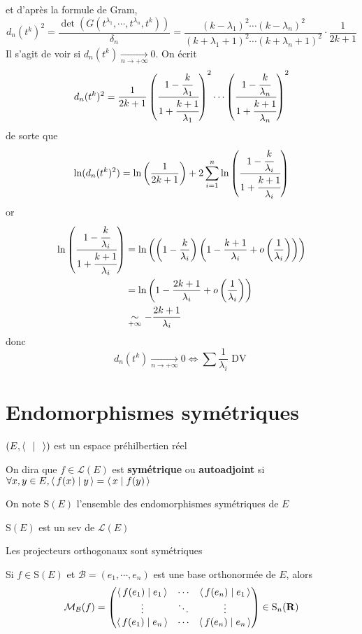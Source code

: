 et d'après la formule de Gram, \[
    d_n(t^k)^2 = \frac{\det(G(t^{\lambda_1}, \cdots , t^{\lambda_n}, t^k))}{\delta_n}= \frac{(k-\lambda_1)^2\cdots (k-\lambda_n)^2 }{(k+\lambda_1+1)^2 \cdots (k+\lambda_n+1)^2 } \cdot \frac{1}{2k+1}
\] 
Il s'agit de voir si $d_n(t^k) \xrightarrow[n\to+\infty]{}0$. On écrit \[
    d_n(t^k)^2 =\frac{1}{2k+1} \left( \cfrac{1-\cfrac k{\lambda_1}}{1+\cfrac{k+1}{\lambda_1}} \right) ^2  \cdots 
    \left( \cfrac{1-\cfrac k{\lambda_n}}{1+\cfrac{k+1}{\lambda_n}} \right) ^2
\] 
de sorte que \[
    \ln(d_n(t^k)^2 )= \ln\left( \frac{1}{2k+1} \right) + 2 \sum_{i=1}^{n} \ln\left( \cfrac{1-\cfrac k{\lambda_i}}{1+\cfrac{k+1}{\lambda_i}} \right) 
\] 
or \begin{align*}
    \ln\left( \cfrac{1-\cfrac k{\lambda_i}}{1+\cfrac{k+1}{\lambda_i}} \right) &= \ln \left( \left( 1-\frac{k}{\lambda_i} \right)  \left( 1-\frac{k+1}{\lambda_i}+o\left( \frac{1}{\lambda_i} \right)  \right) \right) \\ &=\ln\left( 1-\frac{2k+1}{\lambda_i}+o\left( \frac{1}{\lambda_i} \right)  \right) \\&\underset{+\infty}\sim -\frac{2k+1}{\lambda_i}
\end{align*}
donc \[
    d_n(t^k) \xrightarrow[n\to+\infty]{}0 \iff  \sum \frac{1}{\lambda_i}\text{ DV }
\] 

\section{Endomorphismes symétriques}

\begin{defprop}
    \Hyp $(E, \scalar{\;}{\;} )$ est un espace préhilbertien réel
    \begin{concenum}
    \item On dira que $f \in  \mathcal  L(E)$ est \textbf{symétrique} ou \textbf{autoadjoint} si $\forall  x, y \in  E, \scalar{f(x)}{y} = \scalar{x}{f(y)} $ 
    \item On note $\mathrm S(E)$ l'ensemble des endomorphismes symétriques de  $E$
    \item  $\mathrm S(E)$ est un sev de  $\mathcal  L(E)$
    \end{concenum}
\end{defprop}

\begin{ex}
Les projecteurs orthogonaux sont symétriques
\end{ex}

\begin{rem}
    Si $f \in  \mathrm  S(E)$ et $\mathcal  B=(e_1, \cdots , e_n)$ est une base orthonormée de $E$, alors  \[
        \mathcal  M_{\mathcal  B}(f)= \begin{pmatrix}
            \scalar{f(e_1)}{e_1} & \cdots  & \scalar{f(e_n)}{e_1} \\
            \vdots & \ddots & \vdots \\
            \scalar{f(e_1)}{e_n} & \cdots  & \scalar{f(e_n)}{e_n} 
        \end{pmatrix} \in  \mathrm S_n(\R)
    \] 
\end{rem}

